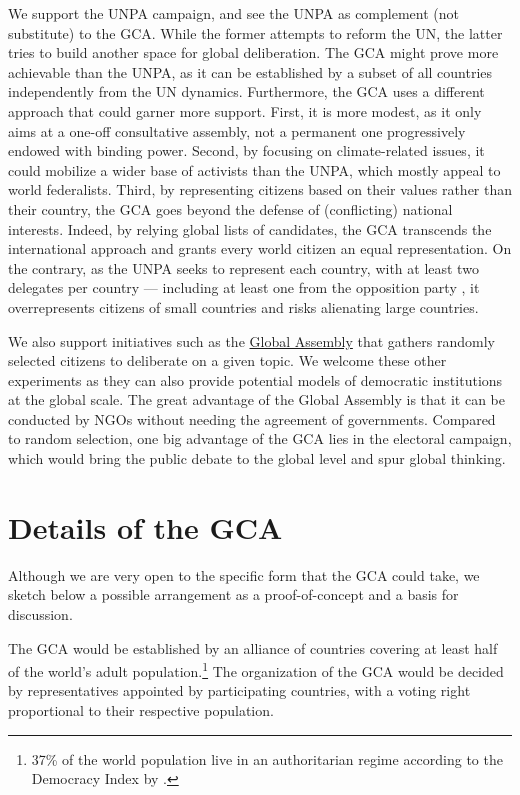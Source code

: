 \documentclass[12pt,english]{article}
\begin{document}
We support the UNPA campaign, and see the UNPA as complement (not substitute) to the GCA. While the former attempts to reform the UN, the latter tries to build another space for global deliberation. The GCA might prove more achievable than the UNPA, as it can be established by a subset of all countries independently from the UN dynamics. Furthermore, the GCA uses a different approach that could garner more support. First, it is more modest, as it only aims at a one-off consultative assembly, not a permanent one progressively endowed with binding power. Second, by focusing on climate-related issues, it could mobilize a wider base of activists than the UNPA, which mostly appeal to world federalists.  Third, by representing citizens based on their values rather than their country, the GCA goes beyond the defense of (conflicting) national interests. Indeed, by relying global lists of candidates, the GCA transcends the international approach and grants every world citizen an equal representation. On the contrary, as the UNPA seeks to represent each country, with at least two delegates per country --- including at least one from the opposition party \citep{leinen_world_2018}, it overrepresents citizens of small countries and risks alienating large countries. 

We also support initiatives such as the \href{https://globalassembly.org/}{Global Assembly} that gathers randomly selected citizens to deliberate on a given topic. We welcome these other experiments as they can also provide potential models of democratic institutions at the global scale. The great advantage of the Global Assembly is that it can be conducted by NGOs without needing the agreement of governments. Compared to random selection, one big advantage of the GCA lies in the electoral campaign, which would bring the public debate to the global level and spur global thinking.%


\section{Details of the GCA}\label{sec:details}

Although we are very open to the specific form that the GCA could take, we sketch below a possible arrangement as a proof-of-concept and a basis for discussion. 

The GCA would be established by an alliance of countries covering at least half of the world's adult population.\footnote{37\% of the world population live in an authoritarian regime according to the Democracy Index by \citet{eiu_democracy_2022}.} The organization of the GCA would be decided by representatives appointed by participating countries, with a voting right proportional to their respective population. 
\end{document}
